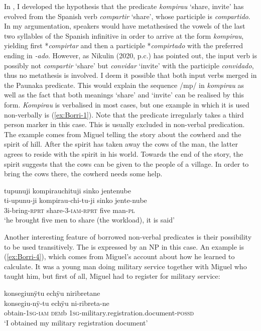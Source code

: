 In \citet[8]{Terhart_subm}, I developed the hypothesis that the predicate \textit{kompirau} ‘share, invite’ has evolved from the Spanish verb \textit{compartir} ‘share’, whose participle is \textit{compartido}. In my argumentation, speakers would have metathesised the vowels of the last two syllables of the Spanish infinitive in order to arrive at the form \textit{kompirau}, yielding first *\textit{compirtar} and then a participle *\textit{compirtado} with the preferred ending in \textit{-ado}. However, as Nikulin (2020, p.c.) has pointed out, the input verb is possibly not \textit{compartir} ‘share’ but \textit{convidar} ‘invite’ with the participle \textit{convidado}, thus no metathesis is involved. I deem it possible that both input verbs merged in the Paunaka predicate. This would explain the sequence /mp/ in \textit{kompirau} as well as the fact that both meanings ‘share’ and ‘invite’ can be realised by this form. \textit{Kompirau} is verbalised in most cases, but one example in which it is used non-verbally is (\ref{ex:Borri-1}). Note that the predicate irregularly takes a third person marker in this case. This is usually excluded in non-verbal predication. The example comes from Miguel telling the story about the cowherd and the spirit of hill. After the spirit has taken away the cows of the man, the latter agrees to reside with the spirit in his world. Towards the end of the story, the spirit suggests that the cows can be given to the people of a village. In order to bring the cows there, the cowherd needs some help.

\ea\label{ex:Borri-1}
\begingl 
\glpreamble tupunuji kompirauchituji sinko jentenube\\
\gla ti-upunu-ji kompirau-chi-tu-ji sinko jente-nube\\ 
\glb 3i-bring-\textsc{rprt} share-3-\textsc{iam}-\textsc{rprt} five man-\textsc{pl}\\ 
\glft ‘he brought five men to share (the workload), it is said’
\trailingcitation{[mxx-n151017l-1.81]}
\xe

Another interesting feature of borrowed non-verbal predicates is their possibility to be used transitively. The  is expressed by an NP in this case. An example is (\ref{ex:Borri-4}), which comes from Miguel’s account about how he learned to calculate. It was a young man doing military service together with Miguel who taught him, but first of all, Miguel had to register for military service:

\ea\label{ex:Borri-4}
\begingl
\glpreamble konsegiunÿtu echÿu niribretane\\
\gla konsegiu-nÿ-tu echÿu ni-ribreta-ne\\
\glb obtain-1\textsc{sg}-\textsc{iam} \textsc{dem}b 1\textsc{sg}-military.registration.document-\textsc{possd}\\
\glft ‘I obtained my military registration document’
\endgl
\trailingcitation{[mxx-p181027l-1.114]}
\xe


